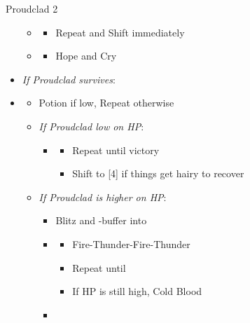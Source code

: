 \begin{battle}[2:01]{Proudclad 2}
\begin{multicols}{2}
\begin{itemize}
            \begin{itemize}
              \item \first
                    \begin{itemize}
                      \item Repeat and Shift immediately
                    \end{itemize}
              \item \second
                    \begin{itemize}
                      \item Hope and Cry
                    \end{itemize}
            \end{itemize}
      \item \textit{If Proudclad survives}:
      \item \fourth
            \begin{itemize}
              \item Potion if low, Repeat otherwise
              \item \textit{If Proudclad low on HP}:
                    \begin{itemize}
                      \item \second
                            \begin{itemize}
                              \item Repeat until victory
                              \item Shift to [4] if things get hairy to recover
                            \end{itemize}
                    \end{itemize}
              \item \textit{If Proudclad is higher on HP}:
                    \begin{itemize}
                      \item Blitz and \rav-buffer into
                      \item \sixth
                            \begin{itemize}
                              \item Fire-Thunder-Fire-Thunder
                              \item Repeat until \stagger
                              \item If HP is still high, Cold Blood
                            \end{itemize}
                      \item \second

\end{itemize}
\end{itemize}
\end{itemize}
\end{multicols}
\end{battle}
